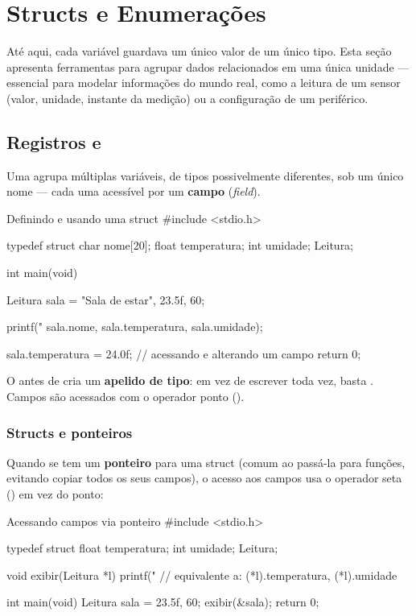 \chapter{Structs e Enumerações}
\label{cap:structs}

Até aqui, cada variável guardava um único valor de um único tipo. Esta seção apresenta ferramentas para agrupar dados relacionados em uma única unidade — essencial para modelar informações do mundo real, como a leitura de um sensor (valor, unidade, instante da medição) ou a configuração de um periférico.

\section{Registros e }

Uma  agrupa múltiplas variáveis, de tipos possivelmente diferentes, sob um único nome — cada uma acessível por um \textbf{campo} (\emph{field}).

\begin{codigoc}{Definindo e usando uma struct}
#include <stdio.h>

typedef struct {
    char nome[20];
    float temperatura;
    int  umidade;
} Leitura;

int main(void) {
    Leitura sala = {"Sala de estar", 23.5f, 60};

    printf("%
           sala.nome, sala.temperatura, sala.umidade);

    sala.temperatura = 24.0f;   // acessando e alterando um campo
    return 0;
}
\end{codigoc}

O  antes de  cria um \textbf{apelido de tipo}: em vez de escrever  toda vez, basta . Campos são acessados com o operador ponto ().

\subsection{Structs e ponteiros}

Quando se tem um \textbf{ponteiro} para uma struct (comum ao passá-la para funções, evitando copiar todos os seus campos), o acesso aos campos usa o operador seta (\code{->}) em vez do ponto:

\begin{codigoc}{Acessando campos via ponteiro}
#include <stdio.h>

typedef struct {
    float temperatura;
    int umidade;
} Leitura;

void exibir(Leitura *l) {
    printf("%
    // equivalente a: (*l).temperatura, (*l).umidade
}

int main(void) {
    Leitura sala = {23.5f, 60};
    exibir(&sala);
    return 0;
}
\end{codigoc}

